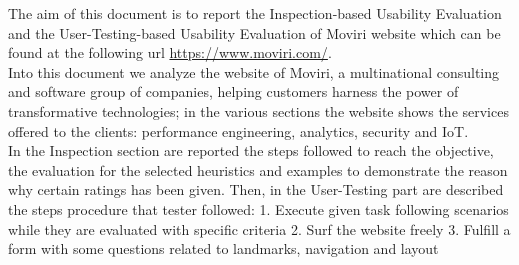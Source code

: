 The aim of this document is to report the Inspection-based Usability Evaluation and the User-Testing-based Usability Evaluation of Moviri website which can be found at the following url \url{https://www.moviri.com/}.  
\\
Into this document we analyze the website of Moviri, a multinational consulting and software group of companies, helping customers harness the power of transformative technologies; in the various sections the website shows the services offered to the clients: performance engineering, analytics, security and IoT. 
\\
In the Inspection section are reported the steps followed to reach the objective, the evaluation for the selected heuristics and examples to demonstrate the reason why certain ratings has been given. Then, in the User-Testing part are described the steps procedure that tester followed: 1. Execute given task following scenarios while they are evaluated with specific criteria 2. Surf the website freely 3. Fulfill a form with some questions related to landmarks, navigation and layout 

 